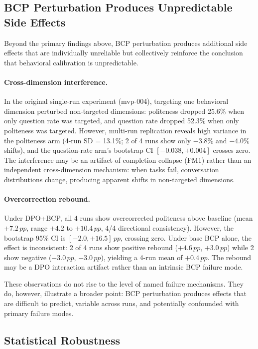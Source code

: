 \documentclass[11pt,a4paper]{article}
\newcommand{\pp}{\,pp}
\begin{document}
\subsection{BCP Perturbation Produces Unpredictable Side Effects}
\label{sec:side_effects}

Beyond the primary findings above, BCP perturbation produces additional side effects that are individually unreliable but collectively reinforce the conclusion that behavioral calibration is unpredictable.

\paragraph{Cross-dimension interference.}
In the original single-run experiment (mvp-004), targeting one behavioral dimension perturbed non-targeted dimensions: politeness dropped 25.6\% when only question rate was targeted, and question rate dropped 52.3\% when only politeness was targeted.
However, multi-run replication reveals high variance in the politeness arm (4-run SD = 13.1\%; 2 of 4 runs show only $-3.8\%$ and $-4.0\%$ shifts), and the question-rate arm's bootstrap CI $[-0.038, +0.004]$ crosses zero.
The interference may be an artifact of completion collapse (FM1) rather than an independent cross-dimension mechanism: when tasks fail, conversation distributions change, producing apparent shifts in non-targeted dimensions.

\paragraph{Overcorrection rebound.}
Under DPO+BCP, all 4 runs show overcorrected politeness above baseline (mean $+7.2\pp$, range $+4.2$ to $+10.4\pp$, 4/4 directional consistency).
However, the bootstrap 95\% CI is $[-2.0, +16.5]\pp$, crossing zero.
Under base BCP alone, the effect is inconsistent: 2 of 4 runs show positive rebound ($+4.6\pp$, $+3.0\pp$) while 2 show negative ($-3.0\pp$, $-3.0\pp$), yielding a 4-run mean of $+0.4\pp$.
The rebound may be a DPO interaction artifact rather than an intrinsic BCP failure mode.

These observations do not rise to the level of named failure mechanisms.
They do, however, illustrate a broader point: BCP perturbation produces effects that are difficult to predict, variable across runs, and potentially confounded with primary failure modes.

\subsection{Statistical Robustness}
\label{sec:bootstrap}
\end{document}

